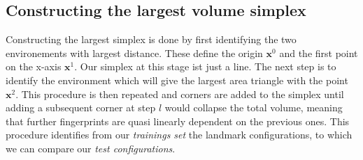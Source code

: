 \subsection{Constructing the largest volume simplex}
Constructing the largest simplex is done by first identifying the two environements with largest distance. These define the origin $\mathbf{x}^0$ and the first point on the x-axis $\mathbf{x}^1$. Our simplex at this stage ist just a line. The next step is to identify the environment which will give the largest area triangle with the point $\mathbf{x}^2$. This procedure is then repeated and corners are added to the simplex until adding a subsequent corner at step $l$ would collapse the total volume, meaning that further fingerprints are quasi linearly dependent on the previous ones. This procedure identifies from our \emph{trainings set} the landmark configurations, to which we can compare our \emph{test configurations}.